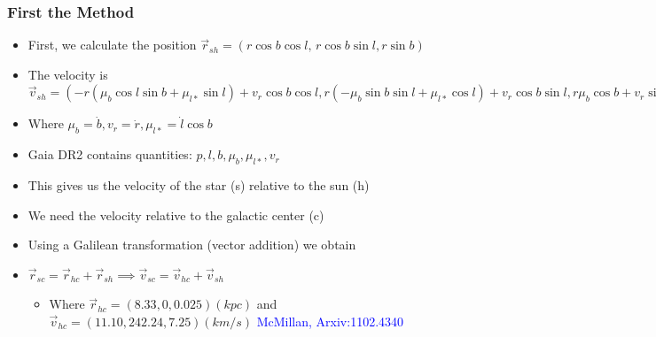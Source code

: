 \documentclass{beamer}
\begin{document}
\begin{frame}
\frametitle{First the Method}
\begin{itemize}
\item First, we calculate the position $\vec{r}_{sh}=(r \cos b \cos l,\, r \cos b \sin l, r \sin b)$
\item The velocity is $\vec{v}_{sh}=(-r(\mu_b \cos l \sin b + \mu_{l*} \sin l) + v_r \cos b \cos l,
r(-\mu_b \sin b \sin l + \mu_{l*} \cos l) + v_r \cos b \sin l, r \mu_b \cos b + v_r \sin b)$
\item Where $\mu_b=\dot{b}, v_r=\dot{r}, \mu_{l*}=\dot{l} \cos b$
\item Gaia DR2 contains quantities: $p, l, b, \mu_b, \mu_{l*}, v_r$
\item This gives us the velocity of the star (s) relative to the sun (h)
\item We need the velocity relative to the galactic center (c)
\item Using a Galilean transformation (vector addition) we obtain
\item $\vec{r}_{sc}=\vec{r}_{hc}+\vec{r}_{sh} \implies \vec{v}_{sc}=\vec{v}_{hc}+\vec{v}_{sh}$
\begin{itemize}
\item Where $\vec{r}_{hc}=(8.33,0,0.025)(kpc)$ and $\vec{v}_{hc}=( 11.10,  242.24,  7.25)(km/s)$
\hspace*{\fill} \textcolor{blue} {McMillan, Arxiv:1102.4340}
\end{itemize}


\end{itemize}
\end{frame}
\end{document}
